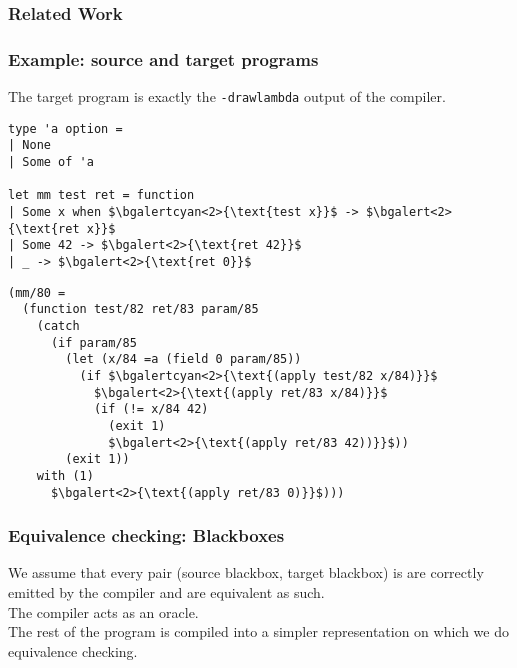 \documentclass{beamer}
\begin{document}
\begin{frame}
  \frametitle{Related Work}
\end{frame}

\begin{frame}[fragile]
  \frametitle{Example: source and target programs}
  The target program is exactly the \texttt{-drawlambda} output of the compiler.

\begin{small}
  \hspace{-1em}
  \begin{minipage}{0.36\linewidth}
\begin{lstlisting}
type 'a option =
| None
| Some of 'a

let mm test ret = function
| Some x when $\bgalertcyan<2>{\text{test x}}$ -> $\bgalert<2>{\text{ret x}}$
| Some 42 -> $\bgalert<2>{\text{ret 42}}$
| _ -> $\bgalert<2>{\text{ret 0}}$
\end{lstlisting}
  \end{minipage}
  \hfill
  \begin{minipage}{0.64\linewidth}
\begin{lstlisting}
(mm/80 =
  (function test/82 ret/83 param/85
    (catch
      (if param/85
        (let (x/84 =a (field 0 param/85))
          (if $\bgalertcyan<2>{\text{(apply test/82 x/84)}}$
            $\bgalert<2>{\text{(apply ret/83 x/84)}}$
            (if (!= x/84 42)
              (exit 1)
              $\bgalert<2>{\text{(apply ret/83 42))}}$))
        (exit 1))
    with (1)
      $\bgalert<2>{\text{(apply ret/83 0)}}$)))
\end{lstlisting}
  \end{minipage}
\end{small}
  \pause
\end{frame}

\begin{frame}
  \frametitle{Equivalence checking: Blackboxes}
  We assume that every pair (source blackbox, target blackbox) is are correctly emitted
  by the compiler and are equivalent as such. \\
  The compiler acts as an oracle. \\
  The rest of the program is compiled into a simpler representation on which we do equivalence checking. 

\end{frame}
\end{document}
